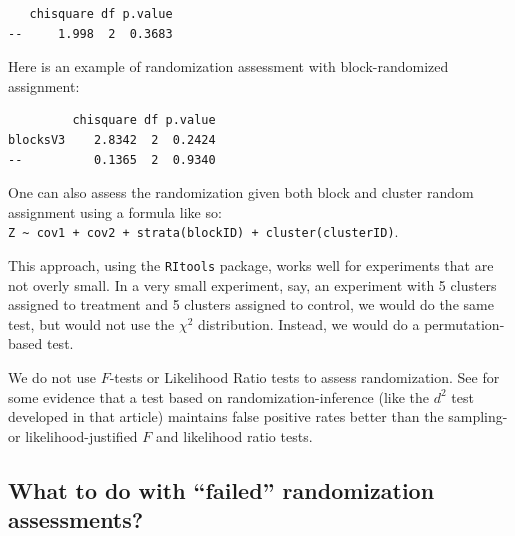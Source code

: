 \documentclass[
  12pt,
]{book}
\newenvironment{Shaded}{\begin{snugshade}}{\end{snugshade}}
\newcommand{\AttributeTok}[1]{\textcolor[rgb]{0.77,0.63,0.00}{#1}}
\newcommand{\FunctionTok}[1]{\textcolor[rgb]{0.00,0.00,0.00}{#1}}
\newcommand{\NormalTok}[1]{#1}
\newcommand{\OtherTok}[1]{\textcolor[rgb]{0.56,0.35,0.01}{#1}}
\newcommand{\SpecialCharTok}[1]{\textcolor[rgb]{0.00,0.00,0.00}{#1}}
\theoremstyle{definition}
\theoremstyle{definition}
\theoremstyle{definition}
\theoremstyle{remark}
\begin{document}
\begin{verbatim}
   chisquare df p.value
--     1.998  2  0.3683
\end{verbatim}

Here is an example of randomization assessment with block-randomized
assignment:

\begin{Shaded}
\end{Shaded}

\begin{verbatim}
         chisquare df p.value
blocksV3    2.8342  2  0.2424
--          0.1365  2  0.9340
\end{verbatim}

One can also assess the randomization given both block and cluster
random assignment using a formula like so:
\texttt{Z\ \textasciitilde{}\ cov1\ +\ cov2\ +\ strata(blockID)\ +\ cluster(clusterID)}.

This approach, using the \texttt{RItools} package, works well for
experiments that are not overly small. In a very small experiment, say,
an experiment with 5 clusters assigned to treatment and 5 clusters
assigned to control, we would do the same test, but would not use the
\(\chi^2\) distribution. Instead, we would do a permutation-based test.

We do not use \(F\)-tests or Likelihood Ratio tests to assess
randomization. See \citet{hansen_covariate_2008} for some evidence that
a test based on randomization-inference (like the \(d^2\) test developed
in that article) maintains false positive rates better than the
sampling- or likelihood-justified \(F\) and likelihood ratio tests.

\hypertarget{what-to-do-with-failed-randomization-assessments}{%
\subsection{What to do with ``failed'' randomization
assessments?}\label{what-to-do-with-failed-randomization-assessments}}
\end{document}
